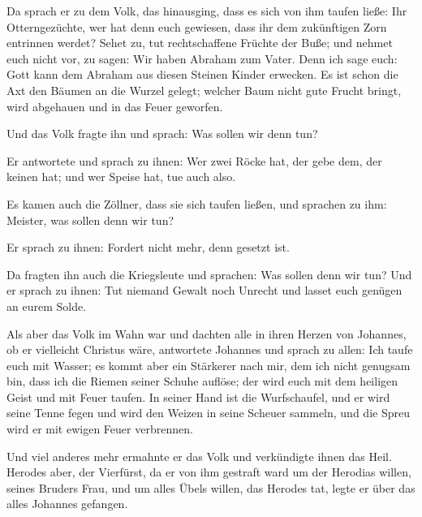  Da sprach er zu dem Volk, das hinausging, dass es sich
von ihm taufen ließe: Ihr Otterngezüchte, wer hat denn euch gewiesen,
dass ihr dem zukünftigen Zorn entrinnen werdet?  Sehet zu,
tut rechtschaffene Früchte der Buße; und nehmet euch nicht vor, zu
sagen: Wir haben Abraham zum Vater. Denn ich sage euch: Gott kann dem
Abraham aus diesen Steinen Kinder erwecken.  Es ist schon
die Axt den Bäumen an die Wurzel gelegt; welcher Baum nicht gute Frucht
bringt, wird abgehauen und in das Feuer geworfen.

 Und das Volk fragte ihn und sprach: Was sollen wir denn
tun?

 Er antwortete und sprach zu ihnen: Wer zwei Röcke hat,
der gebe dem, der keinen hat; und wer Speise hat, tue auch also.

 Es kamen auch die Zöllner, dass sie sich taufen ließen,
und sprachen zu ihm: Meister, was sollen denn wir tun?

 Er sprach zu ihnen: Fordert nicht mehr, denn gesetzt
ist.

 Da fragten ihn auch die Kriegsleute und sprachen: Was
sollen denn wir tun? Und er sprach zu ihnen: Tut niemand Gewalt noch
Unrecht und lasset euch genügen an eurem Solde.

 Als aber das Volk im Wahn war und dachten alle in ihren
Herzen von Johannes, ob er vielleicht Christus wäre, 
antwortete Johannes und sprach zu allen: Ich taufe euch mit Wasser; es
kommt aber ein Stärkerer nach mir, dem ich nicht genugsam bin, dass ich
die Riemen seiner Schuhe auflöse; der wird euch mit dem heiligen Geist
und mit Feuer taufen.  In seiner Hand ist die
Wurfschaufel, und er wird seine Tenne fegen und wird den Weizen in seine
Scheuer sammeln, und die Spreu wird er mit ewigen Feuer verbrennen.

 Und viel anderes mehr ermahnte er das Volk und
verkündigte ihnen das Heil.  Herodes aber, der Vierfürst,
da er von ihm gestraft ward um der Herodias willen, seines Bruders Frau,
und um alles Übels willen, das Herodes tat,  legte er
über das alles Johannes gefangen.

